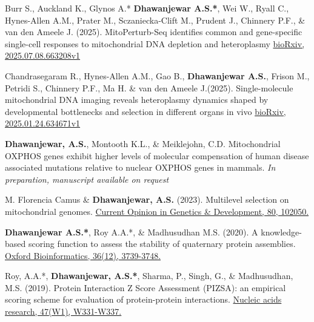 


\begin{cvpubs}

\vspace{-1mm}


  \pubentry
    {Burr S., Auckland K., Glynos A.* \textbf{Dhawanjewar A.S.*}, Wei W., Ryall C., Hynes-Allen A.M., Prater M., Sczaniecka-Clift M., Prudent J., Chinnery P.F., \& van den Ameele J. (2025).}
    {MitoPerturb-Seq identifies common and gene-specific single-cell responses to mitochondrial DNA depletion and heteroplasmy}
    {\href{https://doi.org/10.1101/2025.07.08.663208}{bioRxiv, 2025.07.08.663208v1}}

  \pubentry
    {Chandrasegaram R., Hynes-Allen A.M., Gao B., \textbf{Dhawanjewar A.S.}, Frison M., Petridi S., Chinnery P.F., Ma H. \& van den Ameele J.(2025).}
  {Single-molecule mitochondrial DNA imaging reveals heteroplasmy dynamics shaped by developmental bottlenecks and selection in different organs in vivo}
  {\href{https://doi.org/10.1101/2025.01.24.634671}{bioRxiv, 2025.01.24.634671v1}}

  \pubentry
    {\textbf{Dhawanjewar, A.S.}, Montooth K.L., \& Meiklejohn, C.D.}
  {Mitochondrial OXPHOS genes exhibit higher levels of molecular compensation of human disease associated mutations relative to nuclear OXPHOS genes in mammals.}
  {\textit{In preparation, manuscript available on request}}

  \pubentry
    {M. Florencia Camus \& \textbf{Dhawanjewar, A.S.} (2023).}
  {Multilevel selection on mitochondrial genomes.}
  {\href{https://doi.org/10.1016/j.gde.2023.102050}{Current Opinion in Genetics \& Development, 80, 102050.}}

  \pubentry
    {\textbf{Dhawanjewar A.S.*}, Roy A.A.*, \& Madhusudhan M.S. (2020).}
	{A knowledge-based scoring function to assess the stability of quaternary protein assemblies.}
	{\href{https://doi.org/10.1101/562520}{Oxford Bioinformatics, 36(12), 3739-3748.}}

  \pubentry
     {Roy, A.A.*, \textbf{Dhawanjewar, A.S.*}, Sharma, P., Singh, G., \& Madhusudhan, M.S. (2019).}
  	{Protein Interaction Z Score Assessment (PIZSA): an empirical scoring scheme for evaluation of protein-protein interactions.}
	{\href{https://doi.org/10.1093/nar/gkz368}{Nucleic acids research, 47(W1), W331-W337.}}


\end{cvpubs}
